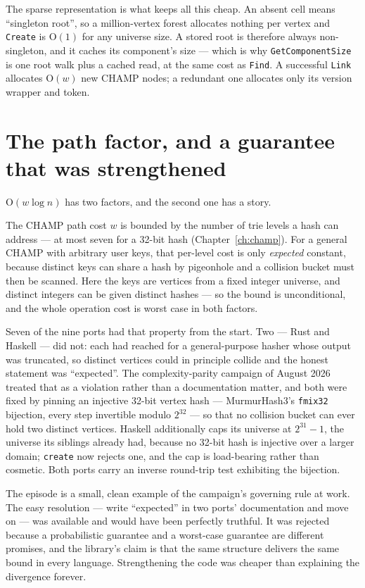 \documentclass[11pt,twoside,openright]{book}
\newcommand{\code}[1]{\texorpdfstring{\textcolor{d7ink}{\texttt{#1}}}{#1}}
\newcommand{\bigoh}[1]{$\mathrm{O}(#1)$}
\begin{document}
The sparse representation is what keeps all this cheap. An absent cell means
``singleton root'', so a million-vertex forest allocates nothing per vertex and
\code{Create} is \bigoh{1} for any universe size. A stored root is therefore
always non-singleton, and it caches its component's size --- which is why
\code{GetComponentSize} is one root walk plus a cached read, at the same cost as
\code{Find}. A successful \code{Link} allocates \bigoh{w} new CHAMP nodes; a
redundant one allocates only its version wrapper and token.

\section{The path factor, and a guarantee that was strengthened}

\bigoh{w \log n} has two factors, and the second one has a story.

The CHAMP path cost $w$ is bounded by the number of trie levels a hash can
address --- at most seven for a 32-bit hash (Chapter~\ref{ch:champ}). For a
general CHAMP with arbitrary user keys, that per-level cost is only
\emph{expected} constant, because distinct keys can share a hash by pigeonhole
and a collision bucket must then be scanned. Here the keys are vertices from a
fixed integer universe, and distinct integers can be given distinct hashes ---
so the bound is unconditional, and the whole operation cost is worst case in
both factors.

Seven of the nine ports had that property from the start. Two --- Rust and
Haskell --- did not: each had reached for a general-purpose hasher whose output
was truncated, so distinct vertices could in principle collide and the honest
statement was ``expected''. The complexity-parity campaign of August 2026 treated
that as a violation rather than a documentation matter, and both were fixed by
pinning an injective 32-bit vertex hash --- MurmurHash3's \code{fmix32}
bijection, every step invertible modulo $2^{32}$ --- so that no collision bucket
can ever hold two distinct vertices. Haskell additionally caps its universe at
$2^{31} - 1$, the universe its siblings already had, because no 32-bit hash is
injective over a larger domain; \code{create} now rejects one, and the cap is
load-bearing rather than cosmetic. Both ports carry an inverse round-trip test
exhibiting the bijection.

The episode is a small, clean example of the campaign's governing rule at work.
The easy resolution --- write ``expected'' in two ports' documentation and move
on --- was available and would have been perfectly truthful. It was rejected
because a probabilistic guarantee and a worst-case guarantee are different
promises, and the library's claim is that the same structure delivers the same
bound in every language. Strengthening the code was cheaper than explaining the
divergence forever.
\end{document}
